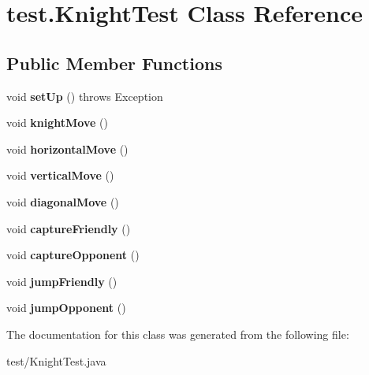 \hypertarget{classtest_1_1KnightTest}{\section{test.\-Knight\-Test Class Reference}
\label{classtest_1_1KnightTest}
}
\subsection*{Public Member Functions}
\begin{DoxyCompactItemize}
\item 
\hypertarget{classtest_1_1KnightTest_a887f017cb5be7901c50d9255b840acd8}{void {\bfseries set\-Up} ()  throws Exception }\label{classtest_1_1KnightTest_a887f017cb5be7901c50d9255b840acd8}

\item 
\hypertarget{classtest_1_1KnightTest_ae51f5094ba7c3a17bc3a573635cbf9aa}{void {\bfseries knight\-Move} ()}\label{classtest_1_1KnightTest_ae51f5094ba7c3a17bc3a573635cbf9aa}

\item 
\hypertarget{classtest_1_1KnightTest_a73b0a656dec84c0b7377e8a40c1e7cb1}{void {\bfseries horizontal\-Move} ()}\label{classtest_1_1KnightTest_a73b0a656dec84c0b7377e8a40c1e7cb1}

\item 
\hypertarget{classtest_1_1KnightTest_a4b557439e93a46885846ce1996e0a1d9}{void {\bfseries vertical\-Move} ()}\label{classtest_1_1KnightTest_a4b557439e93a46885846ce1996e0a1d9}

\item 
\hypertarget{classtest_1_1KnightTest_a2763c72ea814cbcd8ce53de5b26762e7}{void {\bfseries diagonal\-Move} ()}\label{classtest_1_1KnightTest_a2763c72ea814cbcd8ce53de5b26762e7}

\item 
\hypertarget{classtest_1_1KnightTest_a78310f30261e6694da336197653e8a56}{void {\bfseries capture\-Friendly} ()}\label{classtest_1_1KnightTest_a78310f30261e6694da336197653e8a56}

\item 
\hypertarget{classtest_1_1KnightTest_a8ca0dd962c277906f726372d7fa95708}{void {\bfseries capture\-Opponent} ()}\label{classtest_1_1KnightTest_a8ca0dd962c277906f726372d7fa95708}

\item 
\hypertarget{classtest_1_1KnightTest_ab6b77c4698b4bfe88e822d9b80110dd0}{void {\bfseries jump\-Friendly} ()}\label{classtest_1_1KnightTest_ab6b77c4698b4bfe88e822d9b80110dd0}

\item 
\hypertarget{classtest_1_1KnightTest_a9e9f61589b4e1b59eb9a5fa55cff938c}{void {\bfseries jump\-Opponent} ()}\label{classtest_1_1KnightTest_a9e9f61589b4e1b59eb9a5fa55cff938c}

\end{DoxyCompactItemize}


The documentation for this class was generated from the following file\-:\begin{DoxyCompactItemize}
\item 
test/Knight\-Test.\-java\end{DoxyCompactItemize}
